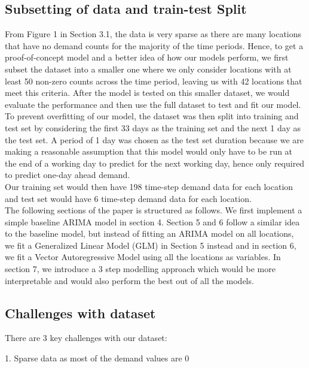 \documentclass[nonblindrev,msom]{informs3} %
\begin{document}
\newpage

\subsection{Subsetting of data and train-test Split}
From Figure 1 in Section 3.1, the data is very sparse as there are many locations that have no demand counts for the majority of the time periods. Hence, to get a proof-of-concept model and a better idea of how our models perform, we first subset the dataset into a smaller one where we only consider locations with at least 50 non-zero counts across the time period, leaving us with 42 locations that meet this criteria. After the model is tested on this smaller dataset, we would evaluate the performance and then use the full dataset to test and fit our model. \\

\noindent To prevent overfitting of our model, the dataset was then split into training and test set by considering the first 33 days as the training set and the next 1 day as the test set. A period of 1 day was chosen as the test set duration because we are making a reasonable assumption that this model would only have to be run at the end of a working day to predict for the next working day, hence only required to predict one-day ahead demand. \\

\noindent Our training set would then have 198 time-step demand data for each location and test set would have 6 time-step demand data for each location. \\

\noindent The following sections of the paper is structured as follows. We first implement a simple baseline ARIMA model in section 4. Section 5 and 6 follow a similar idea to the baseline model, but instead of fitting an ARIMA model on all locations, we fit a Generalized Linear Model (GLM) in Section 5 instead and in section 6, we fit a Vector Autoregressive Model using all the locations as variables. In section 7, we introduce a 3 step modelling approach which would be more interpretable and would also perform the best out of all the models. 

\subsection{Challenges with dataset}

There are 3 key challenges with our dataset:

	1. Sparse data as most of the demand values are 0
	
\end{document}

